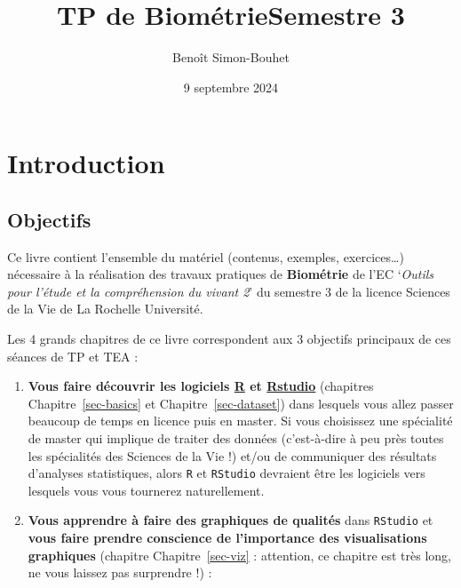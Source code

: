 \documentclass[
  a4paper,
  DIV=11,
  numbers=noendperiod,
  oneside]{scrreprt}
\title{TP de BiométrieSemestre 3}
\author{Benoît Simon-Bouhet}
\date{9 septembre 2024}
\renewcommand*\contentsname{Table des matières}
\newcommand\contentsname{Table des matières}
\begin{document}
\maketitle

\renewcommand*\contentsname{Table des matières}
{
\hypersetup{linkcolor=}
\setcounter{tocdepth}{2}
\tableofcontents
}

\chapter*{Introduction}\label{introduction}


\section*{Objectifs}\label{objectifs}


Ce livre contient l'ensemble du matériel (contenus, exemples,
exercices\ldots) nécessaire à la réalisation des travaux pratiques de
\textbf{Biométrie} de l'EC `\emph{Outils pour l'étude et la
compréhension du vivant 2}' du semestre 3 de la licence Sciences de la
Vie de La Rochelle Université.

Les 4 grands chapitres de ce livre correspondent aux 3 objectifs
principaux de ces séances de TP et TEA :

\begin{enumerate}
\def\labelenumi{\arabic{enumi}.}
\item
  \textbf{Vous faire découvrir les logiciels
  \href{https://cran.r-project.org}{R} et
  \href{https://www.rstudio.com}{Rstudio}} (chapitres
  Chapitre~\ref{sec-basics} et Chapitre~\ref{sec-dataset}) dans lesquels
  vous allez passer beaucoup de temps en licence puis en master. Si vous
  choisissez une spécialité de master qui implique de traiter des
  données (c'est-à-dire à peu près toutes les spécialités des Sciences
  de la Vie !) et/ou de communiquer des résultats d'analyses
  statistiques, alors \texttt{R} et \texttt{RStudio} devraient être les
  logiciels vers lesquels vous vous tournerez naturellement.
\item
  \textbf{Vous apprendre à faire des graphiques de qualités} dans
  \texttt{RStudio} et \textbf{vous faire prendre conscience de
  l'importance des visualisations graphiques} (chapitre
  Chapitre~\ref{sec-viz} : attention, ce chapitre est très long, ne vous
  laissez pas surprendre !) :
\end{enumerate}
\end{document}
